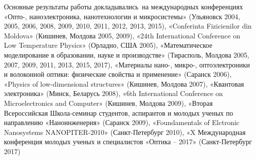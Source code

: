 %
%
%
%
%
%
%
%


{\probation}
Основные результаты работы докладывались~на международных конференциях «Опто-, наноэлектроника, нанотехнологии и микросистемы» (Ульяновск 2004, 2005, 2006, 2008, 2009, 2010, 2011, 2012, 2013, 2015), «Conferinta Fizicienilor din Moldova» (Кишинев, Молдова 2005, 2009), «24th International Conference on Low Temperature Physics» (Орладно, США 2005), «Математическое моделирование в образовании, науке и производстве» (Тирасполь, Молдова 2005, 2007, 2009, 2011, 2013, 2015, 2017), «Материалы нано-, микро-, оптоэлектроники и волоконной оптики: физические свойства и применение» (Саранск 2006), «Physics of low-dimensional structures» (Кишинев, Молдова 2007), «Квантовая электроника» (Минск, Беларусь 2008), «6th International Conference on Microelectronics and Computer» (Кишинев, Молдова 2009), «Вторая Всероссийская Школа-семинар студентов, аспирантов и молодых ученых по направлению «Наноинженерия» (Саранск 2009), «Foundamentals of Elctronic Nanosystems NANOPITER-2010» (Санкт-Петербург 2010), «X Международная конференция молодых ученых и специалистов «Оптика – 2017» (Санкт-Петербург 2017)

